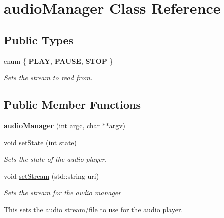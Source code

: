 \hypertarget{classaudio_manager}{}\section{audio\+Manager Class Reference}
\label{classaudio_manager}
\subsection*{Public Types}
\begin{DoxyCompactItemize}
\item 
\hypertarget{classaudio_manager_ab797eef674719ab555f3bc0da5f3e8e9}{}enum \{ {\bfseries P\+L\+A\+Y}, 
{\bfseries P\+A\+U\+S\+E}, 
{\bfseries S\+T\+O\+P}
 \}\label{classaudio_manager_ab797eef674719ab555f3bc0da5f3e8e9}
\begin{DoxyCompactList}\small\item\em Sets the stream to read from. \end{DoxyCompactList}
\end{DoxyCompactItemize}
\subsection*{Public Member Functions}
\begin{DoxyCompactItemize}
\item 
\hypertarget{classaudio_manager_ac33c12e5070a2fb80fce9f231999995d}{}{\bfseries audio\+Manager} (int argc, char $\ast$$\ast$argv)\label{classaudio_manager_ac33c12e5070a2fb80fce9f231999995d}

\item 
void \hyperlink{classaudio_manager_a27cdb7486e1793df14a42fed62aaf673}{set\+State} (int state)
\begin{DoxyCompactList}\small\item\em Sets the state of the audio player. \end{DoxyCompactList}\item 
void \hyperlink{classaudio_manager_ae8e0e3c82b018fda14157b1169bf76e3}{set\+Stream} (std\+::string uri)
\begin{DoxyCompactList}\small\item\em Sets the stream for the audio manager
\begin{DoxyItemize}
\item This sets the audio stream/file to use for the audio player. 
\end{DoxyItemize}\end{DoxyCompactList}\end{DoxyCompactItemize}


